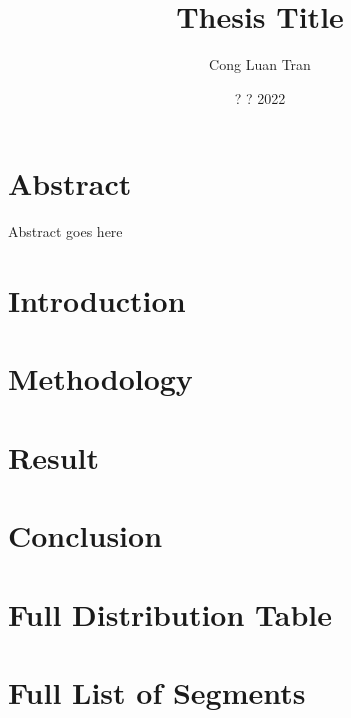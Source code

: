 \documentclass[12pt]{report}
\title{Thesis Title}
\author{Cong Luan Tran}
\date{? ? 2022}
\begin{document}


\chapter*{Abstract}
Abstract goes here

\tableofcontents

\chapter{Introduction}


\chapter{Methodology}


\chapter{Result}


\chapter{Conclusion}


\appendix
\chapter{Full Distribution Table}


\chapter{Full List of Segments}


\printbibliography
\end{document}
